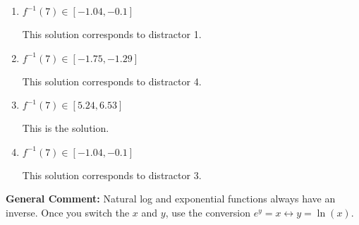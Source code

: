 \documentclass{extbook}[14pt]
\begin{document}
\begin{enumerate}
{\begin{enumerate}[label=\Alph*.]
 This solution corresponds to distractor 2.
\item \( f^{-1}(7) \in [-1.04, -0.1] \)

 This solution corresponds to distractor 1.
\item \( f^{-1}(7) \in [-1.75, -1.29] \)

 This solution corresponds to distractor 4.
\item \( f^{-1}(7) \in [5.24, 6.53] \)

 This is the solution.
\item \( f^{-1}(7) \in [-1.04, -0.1] \)

 This solution corresponds to distractor 3.
\end{enumerate}

\textbf{General Comment:} Natural log and exponential functions always have an inverse. Once you switch the $x$ and $y$, use the conversion $ e^y = x \leftrightarrow y=\ln(x)$.
}
\end{enumerate}
\end{document}
